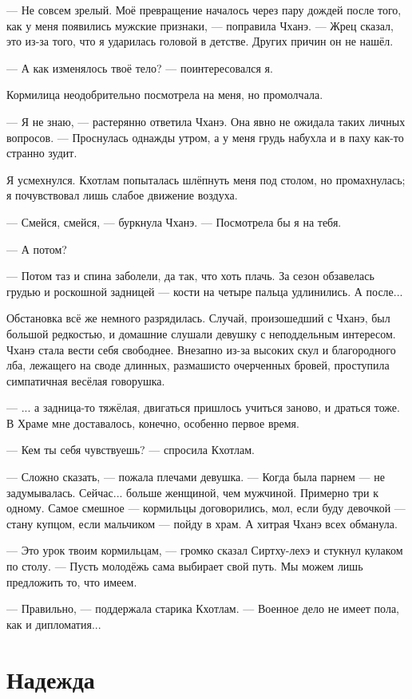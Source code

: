 --- Не совсем зрелый.
Моё превращение началось через пару дождей после того, как у меня появились мужские признаки, --- поправила Чханэ.
--- Жрец сказал, это из-за того, что я ударилась головой в детстве.
Других причин он не нашёл.

--- А как изменялось твоё тело? --- поинтересовался я.

Кормилица неодобрительно посмотрела на меня, но промолчала.

--- Я не знаю, --- растерянно ответила Чханэ.
Она явно не ожидала таких личных вопросов.
--- Проснулась однажды утром, а у меня грудь набухла и в паху как-то странно зудит.

Я усмехнулся.
Кхотлам попыталась шлёпнуть меня под столом, но промахнулась;
я почувствовал лишь слабое движение воздуха.

--- Смейся, смейся, --- буркнула Чханэ.
--- Посмотрела бы я на тебя.

--- А потом?

--- Потом таз и спина заболели, да так, что хоть плачь.
За сезон обзавелась грудью и роскошной задницей --- кости на четыре пальца удлинились.
А после...

Обстановка всё же немного разрядилась.
Случай, произошедший с Чханэ, был большой редкостью, и домашние слушали девушку с неподдельным интересом.
Чханэ стала вести себя свободнее.
Внезапно из-за высоких скул и благородного лба, лежащего на своде длинных, размашисто очерченных бровей, проступила симпатичная весёлая говорушка.

--- ... а задница-то тяжёлая, двигаться пришлось учиться заново, и драться тоже.
В Храме мне доставалось, конечно, особенно первое время.

--- Кем ты себя чувствуешь? --- спросила Кхотлам.

--- Сложно сказать, --- пожала плечами девушка.
--- Когда была парнем --- не задумывалась.
Сейчас... больше женщиной, чем мужчиной.
Примерно три к одному.
Самое смешное --- кормильцы договорились, мол, если буду девочкой --- стану купцом, если мальчиком --- пойду в храм.
А хитрая Чханэ всех обманула.

--- Это урок твоим кормильцам, --- громко сказал Сиртху-лехэ и стукнул кулаком по столу.
--- Пусть молодёжь сама выбирает свой путь.
Мы можем лишь предложить то, что имеем.

--- Правильно, --- поддержала старика Кхотлам.
--- Военное дело не имеет пола, как и дипломатия...

\section{Надежда}

